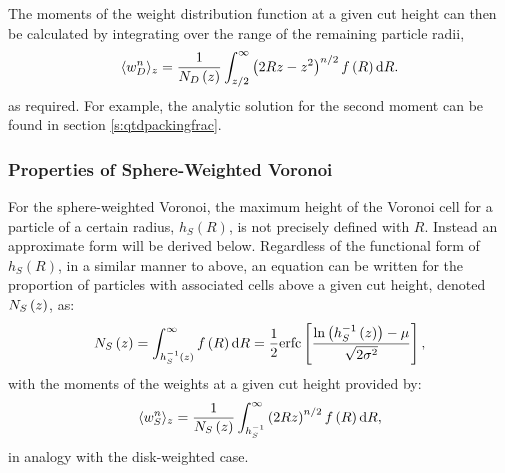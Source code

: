 The moments of the weight distribution function at a given cut height can then be calculated by integrating over the range of the remaining particle radii,
\begin{equation}
	\label{eq:wmom}
	\langle w_D^n \rangle_z = \frac{1}{N_D\left(z\right)}\int_{z/2}^\infty  \left(2Rz-z^2\right)^{n/2} f\left(R\right) \text{d} R.
\end{equation}
as required.
For example, the analytic solution for the second moment can be found in section \ref{s:qtdpackingfrac}.

\subsubsection{Properties of Sphere\--Weighted Voronoi}

For the sphere\--weighted Voronoi, the maximum height of the Voronoi cell for a particle of a certain radius, $h_S\left(R\right)$, is not precisely defined with $R$.
Instead an approximate form will be derived below.
Regardless of the functional form of $h_S\left(R\right)$, in a similar manner to above, an equation can be written for the proportion of particles with associated cells above a given cut height, denoted $N_S\left(z\right)$, as:
\begin{equation}
	\label{eq:nsz}
	N_S\left(z\right) = \int_{h_{S}^{-1}\left(z\right)}^\infty f\left(R\right) \text{d}R = \frac{1}{2}\text{erfc}\left[\frac{\ln{\left(h_{S}^{-1}\left(z\right)\right)}-\mu}{\sqrt{2\sigma^2}}\right],
\end{equation}
with the moments of the weights at a given cut height provided by:
\begin{equation}
	\label{eq:wns}
	\langle w_S^n \rangle_z = \frac{1}{N_S\left(z\right)}\int_{h_{S}^{-1}}^\infty  \left(2Rz\right)^{n/2} f\left(R\right) \text{d} R,
\end{equation}
in analogy with the disk\--weighted case.

